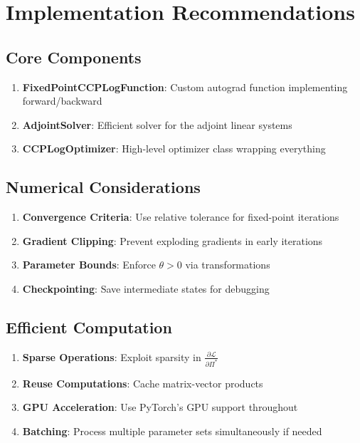 \documentclass[11pt]{article}
\theoremstyle{definition}
\begin{document}
\section{Implementation Recommendations}

\subsection{Core Components}

\begin{enumerate}
    \item \textbf{FixedPointCCPLogFunction}: Custom autograd function implementing forward/backward
    \item \textbf{AdjointSolver}: Efficient solver for the adjoint linear systems
    \item \textbf{CCPLogOptimizer}: High-level optimizer class wrapping everything
\end{enumerate}

\subsection{Numerical Considerations}

\begin{enumerate}
    \item \textbf{Convergence Criteria}: Use relative tolerance for fixed-point iterations
    \item \textbf{Gradient Clipping}: Prevent exploding gradients in early iterations
    \item \textbf{Parameter Bounds}: Enforce $\theta > 0$ via transformations
    \item \textbf{Checkpointing}: Save intermediate states for debugging
\end{enumerate}

\subsection{Efficient Computation}

\begin{enumerate}
    \item \textbf{Sparse Operations}: Exploit sparsity in $\frac{\partial \mathcal{L}}{\partial \Pi^*}$
    \item \textbf{Reuse Computations}: Cache matrix-vector products
    \item \textbf{GPU Acceleration}: Use PyTorch's GPU support throughout
    \item \textbf{Batching}: Process multiple parameter sets simultaneously if needed
\end{enumerate}
\end{document}
